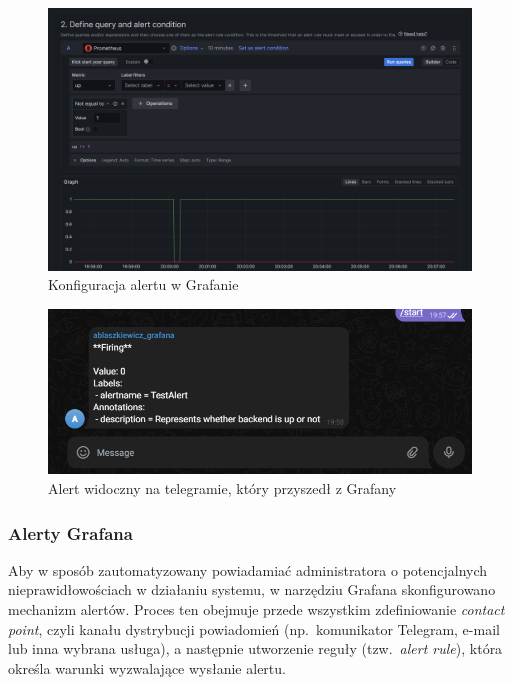 \documentclass{article}
\begin{document}
\begin{figure}[H]
    \centering
    \includegraphics[width=1\linewidth]{konfiguracjaAlertGrafana.png}
    \caption{Konfiguracja alertu w Grafanie}
    \label{fig:enter-label}
\end{figure}

\begin{figure}[H]
    \centering
    \includegraphics[width=1\linewidth]{alertGrafana.png}
    \caption{Alert widoczny na telegramie, który przyszedł z Grafany}
    \label{fig:enter-label}
\end{figure}

\subsubsection{Alerty Grafana}

Aby w sposób zautomatyzowany powiadamiać administratora o potencjalnych nieprawidłowościach w działaniu systemu, w narzędziu Grafana skonfigurowano mechanizm alertów. Proces ten obejmuje przede wszystkim zdefiniowanie \textit{contact point}, czyli kanału dystrybucji powiadomień (np.\ komunikator Telegram, e-mail lub inna wybrana usługa), a następnie utworzenie reguły (tzw.\ \textit{alert rule}), która określa warunki wyzwalające wysłanie alertu.
\end{document}
